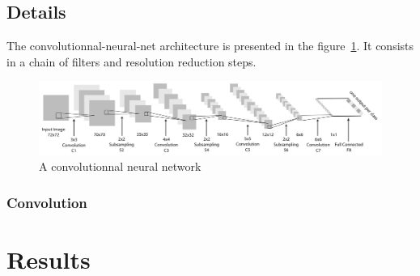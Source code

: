 \documentclass{article} %
\begin{document}
\subsection{Details}
The convolutionnal-neural-net\cite{?} architecture is presented in the figure~\ref{fig:convolutionnal-neural-net}. It consists in a chain of filters and resolution reduction steps. 
\begin{figure}[h]
\label{fig:convolutionnal-neural-net}
\includegraphics[width=\textwidth]{CNN.png}
\caption{A convolutionnal neural network}
\end{figure}

\subsubsection{Convolution}



\section{Results}
\end{document}
